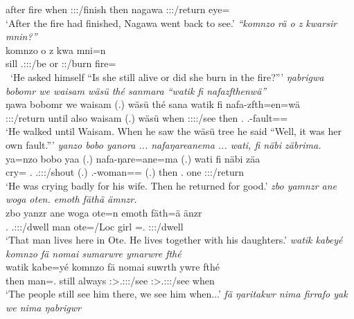 \begin{exe}
	\Dem{} after fire when \Sg:\Sbj:\Pst:\Pfv/finish then nagawa \Sg:\Sbj:\Pst:\Ipfv/return eye=\Purp\\
	\trans `After the fire had finished, Nagawa went back to see.'
	\emph{``komnzo rä o z kwarsir mnin?''}\\
	\gll komnzo  o z kwa mni=n\\
	sill \Tsg.\F:\Sbj:\Nonpast:\Ipfv/be or \Iam{} \Sg:\Rpst:\Ipfv/burn fire=\Loc\\\
	\trans `He asked himself ``Is she still alive or did she burn in the fire?'''
\exi{101}
	\emph{ŋabrigwa bobomr we waisam wäsü thé sanmara ``watik fi nafazfthenwä''}\\
	\gll ŋa\stem{brig}wa bobomr we waisam (.) wäsü thé san\stem{mar}a watik fi nafa-zfth=en=wä\\
	\Sg:\Sbj:\Pst:\Ipfv/return until also waisam (.) wäsü when \Sg:\Sbj:\Pst:\Pfv:\Venit/see then \Third.\Abs{} \Third.\Poss-fault=\Loc=\Emph{}\\
	\trans `He walked until Waisam. When he saw the wäsü tree he said ``Well, it was her own fault.'''
\exi{102}
	\emph{yanzo bobo yanora ... nafaŋareanema ... wati, fi näbi zäbrima.}\\
	\gll ya=nzo bobo ya\stem{nor}a (.) nafa-ŋare=ane=ma (.) wati fi näbi zäa\\
	cry=\Only{} \Med.\All{} \Tsg.\Masc:\Sbj:\Pst:\Ipfv/shout (.) \Third.\Poss-woman=\Poss=\Char{} (.) then \Third.\Abs{} one \Sg:\Sbj:\Pst:\Pfv/return\\
	\trans `He was crying badly for his wife. Then he returned for good.'
\exi{103}
	\emph{zbo yamnzr ane woga oten. emoth fäthä ämnzr.}\\
	\gll zbo yanzr ane woga ote=n emoth fäth=ä änzr\\
	\Prox.\All{} \Tsg.\Masc:\Sbj:\Nonpast:\Ipfv/dwell \Dem{} man ote=/Loc{} girl \Dim=\Assoc.\Pl{} \Stpl:\Sbj:\Nonpast:\Ipfv/dwell\\
	\trans `That man lives here in Ote. He lives together with his daughters.'
\exi{104}
	\emph{watik kabeyé komnzo fä nomai sumarwre ymarwre fthé}\\
	\gll watik kabe=yé komnzo fä nomai suwrth ywre fthé\\
	then man=\Erg.\Nsg{} still \Dist{} always \Stpl:\Sbj>\Tsg.\Masc:\Obj:\Rpst:\Ipfv/see \Fnsg:\Sbj>\Tsg.\Masc:\Obj:\Rpst:\Ipfv/see when\\
	\trans `The people still see him there, we see him when...'
	\emph{fä ŋaritakwr nima firrafo yak we nima ŋabrigwr}\\

\end{exe}
